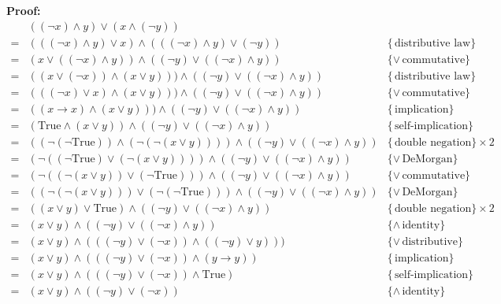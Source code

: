\documentclass[fleqn]{article}
\newenvironment{proof}
  {\[\begin{array}{lll}}
  {\end{array}\]}
\newcommand{\law}[2][\!]{\{{#1\,}\mbox{{#2}}\}}
\newcommand{\True}[0]{\mathrm{True}}
\begin{document}
\begin{enumerate}
      \textbf{Proof:}
      \begin{proof}
          & ((\neg x) \wedge y) \vee (x \wedge (\neg y)) & \\
        = & (((\neg x) \wedge y) \vee x) \wedge (((\neg x) \wedge y) \vee (\neg y)) & \law{distributive law} \\
        = & (x \vee ((\neg x) \wedge y)) \wedge ((\neg y) \vee ((\neg x) \wedge y)) & \law[\vee]{commutative} \\
        = & ((x \vee (\neg x)) \wedge (x \vee y))) \wedge ((\neg y) \vee ((\neg x) \wedge y)) & \law{distributive law} \\
        = & (((\neg x) \vee x) \wedge (x \vee y))) \wedge ((\neg y) \vee ((\neg x) \wedge y)) & \law[\vee]{commutative} \\
        = & ((x \rightarrow x) \wedge (x \vee y))) \wedge ((\neg y) \vee ((\neg x) \wedge y)) & \law{implication} \\
        = & (\True \wedge (x \vee y)) \wedge ((\neg y) \vee ((\neg x) \wedge y)) & \law{self-implication} \\
        = & ((\neg (\neg \True)) \wedge (\neg (\neg(x \vee y)))) \wedge ((\neg y) \vee ((\neg x) \wedge y)) & \law{double negation} \times 2 \\
        = & (\neg ((\neg \True) \vee (\neg(x \vee y)))) \wedge ((\neg y) \vee ((\neg x) \wedge y)) & \law[\vee]{DeMorgan} \\
        = & (\neg ((\neg(x \vee y)) \vee (\neg \True))) \wedge ((\neg y) \vee ((\neg x) \wedge y)) & \law[\vee]{commutative} \\
        = & ((\neg(\neg(x \vee y))) \vee (\neg (\neg \True))) \wedge ((\neg y) \vee ((\neg x) \wedge y)) & \law[\vee]{DeMorgan} \\
        = & ((x \vee y) \vee \True) \wedge ((\neg y) \vee ((\neg x) \wedge y)) & \law{double negation} \times 2 \\
        = & (x \vee y) \wedge ((\neg y) \vee ((\neg x) \wedge y)) & \law[\wedge]{identity} \\
        = & (x \vee y) \wedge (((\neg y) \vee (\neg x)) \wedge ((\neg y) \vee y))) & \law[\vee]{distributive} \\
        = & (x \vee y) \wedge (((\neg y) \vee (\neg x)) \wedge (y \rightarrow y)) & \law{implication} \\
        = & (x \vee y) \wedge (((\neg y) \vee (\neg x)) \wedge \True) & \law{self-implication} \\
        = & (x \vee y) \wedge ((\neg y) \vee (\neg x)) & \law[\wedge]{identity} \\

\end{proof}
\end{enumerate}
\end{document}
